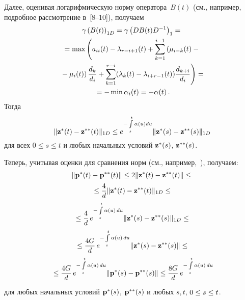\begin{multicols}{2}


Далее, оценивая логарифмическую норму оператора~$B(t)$ (см., например, 
подробное рассмотрение в~[8--10]), получаем
\begin{multline*}
\gamma \left(B(t)\right)_{1D} = \gamma \left(DB(t)D^{-1}\right)_{1}={}\\
{}=
\max \left(\vphantom{\sum\limits_{k=1}^{i-1}}
a_{ii}(t) - \la_{r-i+1}(t) + \sum\limits_{k=1}^{i-1}\left(\mu_{i-k}(t)-{}\right.\right.\\
\left.\left.{}-\mu_i(t)\right)
\fr{d_k}{d_i} +
\sum\limits_{k=1}^{r-i}(\la_k(t)-\la_{i+r-1}(t))\fr{d_{k+i}}{d_i}\right) ={}\\
{}=
 - \min \alpha_i(t) = - \alpha(t)\,.
\end{multline*}
Тогда\\[-7.9pt]
\begin{equation*}
\|{\mathbf z}^*(t)-{\mathbf z}^{**}(t)\|_{1D}\le  e^{-\int\limits_s^t {\alpha(u)du}}\|{\mathbf z}^*(s)-{\mathbf z}^{**}(s)\|_{1D}
\end{equation*}
для всех $0 \le s \le t$ и любых начальных условий ${\mathbf z}^*(s)$, ${\mathbf z}^{**}(s)$.

Теперь, учитывая оценки для сравнения норм (см., например,~\cite{z08b}), получаем:
\begin{multline*}
\|{\mathbf p}^*(t)-{\mathbf p}^{**}(t)\| \le 2\|{\mathbf z}^*(t)-{\mathbf z}^{**}(t)\| \le{}\\
{}\le  \displaystyle\frac{\displaystyle 4\mathstrut}{\displaystyle d\mathstrut}\|{\mathbf z}^*(t)-{\mathbf z}^{**}(t)\|_{1D}\le{} \\
{} \le \displaystyle\frac{\displaystyle 4\mathstrut}{\displaystyle d\mathstrut}\,e^{-\int\limits_s^t {\alpha(u)\,du}}\|{\mathbf z}^*(s)-{\mathbf z}^{**}(s)\|_{1D} 
\le{}\\
{}\le
 \displaystyle\frac{\displaystyle 4G\mathstrut}{\displaystyle d\mathstrut}\,e^{-\int\limits_s^t {\alpha(u)\,du}}\|{\mathbf z}^*(s)-{\mathbf z}^{**}(s)\| \le{} \\
{} \le  \displaystyle\frac{\displaystyle 4G\mathstrut}{\displaystyle d\mathstrut}\,e^{-\int\limits_s^t {\alpha(u)\,du}}\|{\mathbf p}^*(s)-{\mathbf p}^{**}(s)\| \le 
\displaystyle\frac{\displaystyle 8G\mathstrut}{\displaystyle d\mathstrut}\,e^{-\int\limits_s^t {\alpha(u)\,du}} 
\end{multline*}
для любых начальных условий ${\bf p^*}(s)$, ${\bf p^{**}}(s)$ и любых $s,t$, $0\hm\le s\hm\le t$.


\end{multicols}
